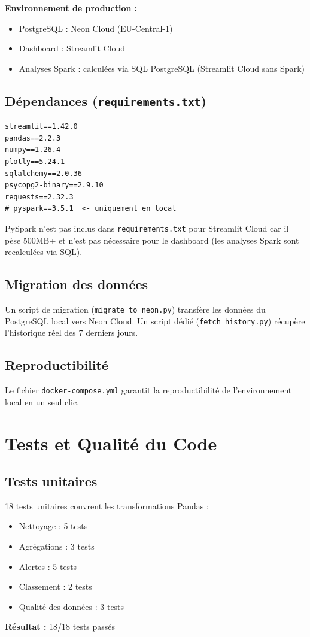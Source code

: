 \documentclass[12pt,a4paper]{article}
\begin{document}
\textbf{Environnement de production :}
\begin{itemize}[noitemsep]
    \item PostgreSQL : Neon Cloud (EU-Central-1)
    \item Dashboard : Streamlit Cloud
    \item Analyses Spark : calculées via SQL PostgreSQL (Streamlit Cloud sans Spark)
\end{itemize}

\subsection{Dépendances (\texttt{requirements.txt})}

\begin{lstlisting}
streamlit==1.42.0
pandas==2.2.3
numpy==1.26.4
plotly==5.24.1
sqlalchemy==2.0.36
psycopg2-binary==2.9.10
requests==2.32.3
# pyspark==3.5.1  <- uniquement en local
\end{lstlisting}

PySpark n'est pas inclus dans \texttt{requirements.txt} pour Streamlit Cloud car il pèse 500MB+ et n'est pas nécessaire pour le dashboard (les analyses Spark sont recalculées via SQL).

\subsection{Migration des données}
Un script de migration (\texttt{migrate\_to\_neon.py}) transfère les données du PostgreSQL local vers Neon Cloud. Un script dédié (\texttt{fetch\_history.py}) récupère l'historique réel des 7 derniers jours.

\subsection{Reproductibilité}
Le fichier \texttt{docker-compose.yml} garantit la reproductibilité de l'environnement local en un seul clic.

\section{Tests et Qualité du Code}

\subsection{Tests unitaires}
18 tests unitaires couvrent les transformations Pandas :
\begin{itemize}[noitemsep]
    \item Nettoyage : 5 tests
    \item Agrégations : 3 tests
    \item Alertes : 5 tests
    \item Classement : 2 tests
    \item Qualité des données : 3 tests
\end{itemize}
\textbf{Résultat :} 18/18 tests passés
\end{document}
